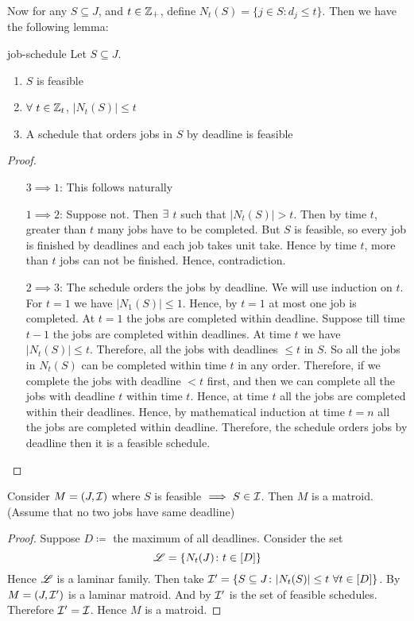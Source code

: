Now  for any $S\subseteq J$, and $t\in\mathbb{Z}_+$, define $N_t(S)=\{j\in S\colon d_j\leq t\}$. Then we have the following lemma:
\begin{lemma}{}{job-schedule}
	Let $S\subseteq J$. \Tfae
	\begin{enumerate}[label=\bfseries\tiny\protect\circled{\small\arabic*}]
		\item $S$ is feasible
		\item $\forall\ t\in\mathbb{Z}_t$, $|N_t(S)|\leq t$
		\item A schedule that orders jobs in $S$ by deadline is feasible
	\end{enumerate}
\end{lemma}
\begin{proof}

\begin{itemize}[wide]
	\item[$3\implies 1$:] This follows naturally
	\item[$1\implies 2$:] Suppose not. Then $\exists$ $t$ such that $|N_t(S)|>t$. Then by time $t$, greater than $t$ many jobs have to be completed. But  $S$ is feasible, so every job is finished by deadlines and each job takes unit take. Hence by time $t$, more than $t$ jobs can not be finished. Hence, contradiction.
	\item[$2\implies 3$:] The schedule orders the jobs by deadline. We will use induction on $t$. For $t=1$ we have $|N_1(S)|\leq 1$. Hence, by $t=1$ at most one job is completed. At $t=1$ the jobs are completed within deadline. Suppose till time $t-1$ the jobs are completed within deadlines. At time $t$ we have $|N_t(S)|\leq t$. Therefore, all the jobs with deadlines $\leq t$ in $S$. So all the jobs in $N_t(S)$ can be completed within time $t$ in any order. Therefore, if we complete the jobs with deadline $<t$ first, and then we can complete all the jobs with deadline $t$ within time $t$. Hence, at time $t$ all the jobs are completed within their deadlines. Hence, by mathematical induction at time $t=n$ all the jobs are completed within deadline. Therefore, the schedule orders jobs by deadline then it is a feasible schedule.
\end{itemize}
\end{proof}
\begin{lemma}{}{}
	Consider $M=(J,\mathcal{I})$ where $S$ is feasible $\implies S\in \mathcal{I}$. Then $M$ is a matroid. (Assume that no two jobs have same deadline)
\end{lemma}
\begin{proof}
	Suppose $D\coloneqq $ the maximum of all deadlines. Consider the set $${\mathscr{L}}=\{N_t(J)\colon t\in [D]\}$$Hence ${\mathscr{L}}$ is a laminar family. Then take $\mathcal{I}'=\{S\subseteq J\colon |N_t(S)|\leq t\ \forall t\in [D]\}$. By  $M=(J,\mathcal{I}')$ is a laminar matroid. And by  $\mathcal{I}'$ is the set of feasible schedules. Therefore $\mathcal{I}'=\mathcal{I}$. Hence $M$ is a matroid.
\end{proof}
